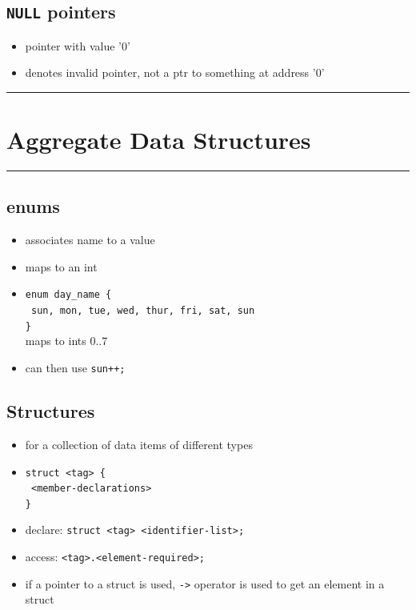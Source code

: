 \documentclass[10pt, multicolumn, a4paper]{article}
\begin{document}
\begin{multicols}{2}
	\subsection*{\texttt{NULL} pointers}
	\begin{itemize}
	\item pointer with value '0'
	\item denotes invalid pointer, not a ptr to something at address '0'
	\end{itemize}
\end{multicols}

\setcounter{section}{2}
\hrule
\section{Aggregate Data Structures}
\hrule 

\begin{multicols}{2}
	\subsection*{enums}
	\begin{itemize}
	\item associates name to a value
	\item maps to an int
	\item \verb|enum day_name {| \\ \texttt{\hspace*{5mm} sun, mon, tue, wed, thur, fri, sat, sun} \\ \verb|}|
		\\ maps to ints 0..7
	\item can then use \verb|sun++;|
	\end{itemize}
	\subsection*{Structures}
	\begin{itemize}
	\item for a collection of data items of different types
	\item \verb|struct <tag> {|	\\ \texttt{\hspace*{5mm} <member-declarations>} \\ \verb|}|
	\item declare: \verb|struct <tag> <identifier-list>;|
	\item access: \verb|<tag>.<element-required>;|
	\item if a pointer to a struct is used, \verb|->| operator is used to get an element in a struct
	\end{itemize}
\end{multicols}
\end{document}
